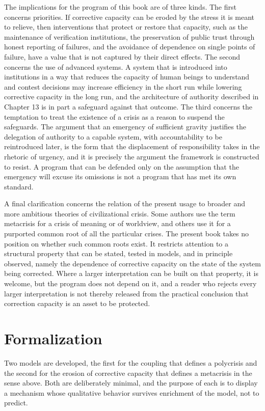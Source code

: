 The implications for the program of this book are of three kinds. The first concerns priorities. If corrective capacity can be eroded by the stress it is meant to relieve, then interventions that protect or restore that capacity, such as the maintenance of verification institutions, the preservation of public trust through honest reporting of failures, and the avoidance of dependence on single points of failure, have a value that is not captured by their direct effects. The second concerns the use of advanced systems. A system that is introduced into institutions in a way that reduces the capacity of human beings to understand and contest decisions may increase efficiency in the short run while lowering corrective capacity in the long run, and the architecture of authority described in Chapter 13 is in part a safeguard against that outcome. The third concerns the temptation to treat the existence of a crisis as a reason to suspend the safeguards. The argument that an emergency of sufficient gravity justifies the delegation of authority to a capable system, with accountability to be reintroduced later, is the form that the displacement of responsibility takes in the rhetoric of urgency, and it is precisely the argument the framework is constructed to resist. A program that can be defended only on the assumption that the emergency will excuse its omissions is not a program that has met its own standard.

A final clarification concerns the relation of the present usage to broader and more ambitious theories of civilizational crisis. Some authors use the term metacrisis for a crisis of meaning or of worldview, and others use it for a purported common root of all the particular crises. The present book takes no position on whether such common roots exist. It restricts attention to a structural property that can be stated, tested in models, and in principle observed, namely the dependence of corrective capacity on the state of the system being corrected. Where a larger interpretation can be built on that property, it is welcome, but the program does not depend on it, and a reader who rejects every larger interpretation is not thereby released from the practical conclusion that correction capacity is an asset to be protected.

\section*{Formalization}

Two models are developed, the first for the coupling that defines a polycrisis and the second for the erosion of corrective capacity that defines a metacrisis in the sense above. Both are deliberately minimal, and the purpose of each is to display a mechanism whose qualitative behavior survives enrichment of the model, not to predict.

